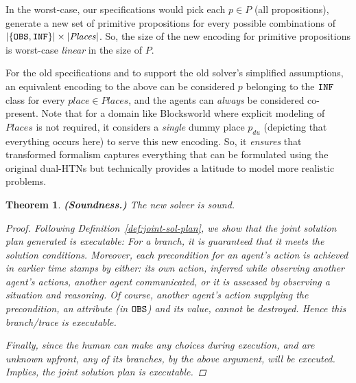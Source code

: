\documentclass[letterpaper]{article} %
\newtheorem{theorem}{Theorem}[section]
\begin{document}
In the worst-case, our specifications would pick each $p \in P$ (all propositions), generate a new set of primitive propositions for every possible combinations of $|\{\texttt{OBS},\texttt{INF}\}| \times |\mathit{Places}|$. 
So, the size of the new encoding for primitive propositions is worst-case \textit{linear} in the size of $P$.

For the old specifications and to support the old solver's simplified assumptions, an equivalent encoding to the above can be considered $p$ belonging to the $\texttt{INF}$ class for every $place \in \mathit{Places}$, and the agents can \textit{always} be considered co-present.  
Note that for a domain like Blocksworld where explicit modeling of $\mathit{Places}$ is not required, it considers a \textit{single} dummy place $p_{du}$ (depicting that everything occurs here) to serve this new encoding. So, it \textit{ensures} that transformed formalism captures everything that can be formulated using the original dual-HTNs but technically provides a latitude to model more realistic problems. 

\begin{theorem}
\textbf{(Soundness.)} The new solver is sound.
\vspace{-0.06in}
\begin{proof}
Following Definition~\ref{def:joint-sol-plan},
we show that the joint solution plan generated is executable:
For a branch, it is guaranteed that it meets the {\em solution conditions}.
Moreover, each precondition for an agent's action is achieved in earlier time stamps by either: its own action, 
\textit{inferred} while observing another agent's actions, 
another agent \textit{communicated},
or it is \textit{assessed} by observing a situation and reasoning.
Of course, another agent’s action supplying the precondition, an attribute (in $\texttt{OBS}$) and its value, cannot be destroyed. 
Hence this branch/trace is executable.

Finally, since the human can make any choices during execution,
and are unknown upfront, any of its branches, by the
above argument, will be executed. 
Implies, the joint solution plan is executable.
\end{proof}
\end{theorem}
\end{document}
